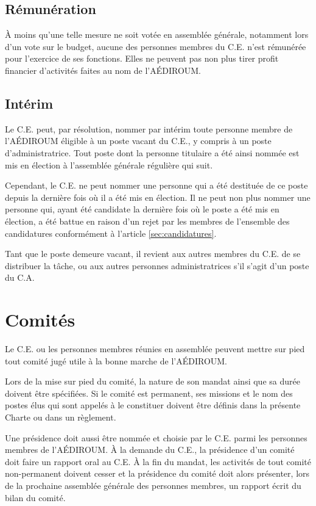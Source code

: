 \documentclass{aediroum}
\newcommand{\article}[1]{article \ref{#1}}
\begin{document}
\subsection{Rémunération}\label{sec:renumeration}

À moins qu'une telle mesure ne soit votée en assemblée générale, notamment lors d'un vote sur le budget, aucune des personnes membres du C.E. n'est rémunérée pour l'exercice de ses fonctions. Elles ne peuvent pas non plus tirer profit financier d'activités faites au nom de l'AÉDIROUM.

\subsection{Intérim}\label{sec:interim}

Le C.E. peut, par résolution, nommer par intérim toute personne membre de l'AÉDIROUM éligible à un poste vacant du C.E., y compris à un poste d'administratrice. Tout poste dont la personne titulaire a été ainsi nommée est mis en élection à l'assemblée générale régulière qui suit.

Cependant, le C.E. ne peut nommer une personne qui a été destituée de ce poste depuis la dernière fois où il a été mis en élection. Il ne peut non plus nommer une personne qui, ayant été candidate la dernière fois où le poste a été mis en élection, a été battue en raison d'un rejet par les membres de l'ensemble des candidatures conformément à l'\article{sec:candidatures}.

Tant que le poste demeure vacant, il revient aux autres membres du C.E. de se distribuer la tâche, ou aux autres personnes administratrices s'il s'agit d'un poste du C.A.

\section{Comités}\label{sec:comites}

Le C.E. ou les personnes membres réunies en assemblée peuvent mettre sur pied tout comité jugé utile à la bonne marche de l'AÉDIROUM.

Lors de la mise sur pied du comité, la nature de son mandat ainsi que sa durée doivent être spécifiées. Si le comité est permanent, ses missions et le nom des postes élus qui sont appelés à le constituer doivent être définis dans la présente Charte ou dans un règlement.

Une présidence doit aussi être nommée et choisie par le C.E. parmi les personnes membres de l'AÉDIROUM. À la demande du C.E., la présidence d'un comité doit faire un rapport oral au C.E. À la fin du mandat, les activités de tout comité non-permanent
doivent cesser et la présidence du comité doit alors présenter, lors de la prochaine assemblée générale des personnes membres, un rapport écrit du bilan du comité.
\end{document}
